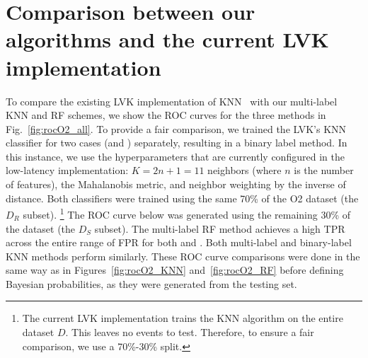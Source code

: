 \section{Comparison between our algorithms and the current LVK implementation}  \label{app:comparison}

To compare the existing \ac{LVK} implementation of \ac{KNN}~\cite{Chatterjee:2019avs} with our multi-label \ac{KNN} and \ac{RF} schemes, we show the \ac{ROC} curves for the three methods in Fig.~\ref{fig:rocO2_all}. To provide a fair comparison, we trained the LVK's \ac{KNN} classifier for two cases (\hasns and \hasrem) separately, resulting in a binary label method. In this instance, we use the hyperparameters that are currently configured in the low-latency implementation: $K = 2n + 1 = 11$ neighbors (where $n$ is the number of features), the Mahalanobis metric, and neighbor weighting by the inverse of distance. Both classifiers were trained using the same 70\% of the \ac{O2} dataset (the $D_R$ subset). \footnote{The current LVK implementation trains the \ac{KNN} algorithm on the entire dataset $D$. This leaves no events to test. Therefore, to ensure a fair comparison, we use a 70\%-30\% split.} The ROC curve below was generated using the remaining 30\% of the dataset (the $D_S$ subset). The multi-label RF method achieves a high \ac{TPR} across the entire range of \ac{FPR} for both \hasns and \hasrem. Both multi-label and binary-label \ac{KNN} methods perform similarly. These \ac{ROC} curve comparisons were done in the same way as in Figures~\ref{fig:rocO2_KNN} and~\ref{fig:rocO2_RF} before defining Bayesian probabilities, as they were generated from the testing set.

